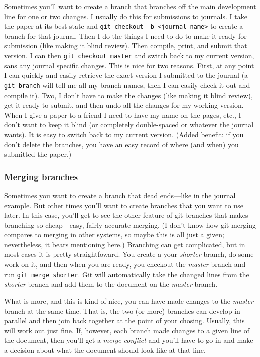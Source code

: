 \documentclass{article}
\begin{document}
Sometimes you'll want to create a branch that branches off the main
development line for one or two changes. I usually do this for
submissions to journals. I take the paper at its best state and
\verb!git checkout -b <journal name>! to create a branch for that
journal. Then I do the things I need to do to make it ready for
submission (like making it blind review). Then compile, print, and
submit that version. I can then \verb!git checkout master! and
switch back to my current version, sans any journal specific
changes. This is nice for two reasons. First, at any point I can
quickly and easily retrieve the exact version I submitted to the
journal (a \verb!git branch! will tell me all my branch names, then
I can easily check it out and compile it). Two, I don't have to
make the changes (like making it blind review), get it ready to
submit, and then undo all the changes for my working version. When
I give a paper to a friend I need to have my name on the pages,
etc., I don't want to keep it blind (or completely double-spaced or
whatever the journal wants). It is easy to switch back to my
current version. (Added benefit: if you don't delete the branches,
you have an easy record of where (and when) you submitted the
paper.)

\subsubsection{Merging branches}

Sometimes you want to create a branch that dead ends—like in the
journal example. But other times you'll want to create branches
that you want to use later. In this case, you'll get to see the
other feature of git branches that makes branching so cheap—easy,
fairly accurate merging. (I don't know how git merging compares to
merging in other systems, so maybe this is all just a given;
nevertheless, it bears mentioning here.) Branching can get
complicated, but in most cases it is pretty straightfoward. You
create a your \emph{shorter} branch, do some work on it, and then
when you are ready, you checkout the \emph{master} branch and run
\verb!git merge shorter!. Git will automatically take the changed
lines from the \emph{shorter} branch and add them to the document
on the \emph{master} branch.

What is more, and this is kind of nice, you can have made changes
to the \emph{master} branch at the same time. That is, the two (or
more) branches can develop in parallel and then join back together
at the point of your chosing. Usually, this will work out just
fine. If, however, each branch made changes to a given line of the
document, then you'll get a \emph{merge-conflict} and you'll have
to go in and make a decision about what the document should look
like at that line.
\end{document}
